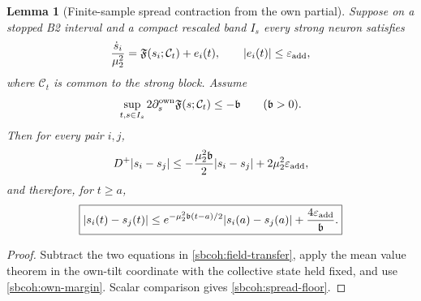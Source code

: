 \documentclass{article} %
\theoremstyle{plain}
\newtheorem{lemma}[theorem]{Lemma}
\theoremstyle{definition}
\theoremstyle{remark}
\begin{document}
\begin{lemma}[Finite-sample spread contraction from the own partial]
\label{sbcoh:spread}
Suppose on a stopped B2 interval and a compact rescaled band $I_s$ every
strong neuron satisfies
\begin{equation}\label{sbcoh:field-transfer}
 \frac{\dot s_i}{\mu_2^2}
 =\mathfrak F(s_i;\mathcal C_t)+e_i(t),
 \qquad
 |e_i(t)|\le\varepsilon_{\rm add},
\end{equation}
where $\mathcal C_t$ is common to the strong block.  Assume
\begin{equation}\label{sbcoh:own-margin}
 \sup_{t,s\in I_s}
 2\partial_s^{\rm own}\mathfrak F(s;\mathcal C_t)
 \le-\mathfrak b
 \qquad(\mathfrak b>0).
\end{equation}
Then for every pair $i,j$,
\begin{equation}\label{sbcoh:spread-dini}
 D^+|s_i-s_j|
 \le-\frac{\mu_2^2\mathfrak b}{2}|s_i-s_j|
      +2\mu_2^2\varepsilon_{\rm add},
\end{equation}
and therefore, for $t\ge a$,
\begin{equation}\label{sbcoh:spread-floor}
 \boxed{
 |s_i(t)-s_j(t)|
 \le e^{-\mu_2^2\mathfrak b(t-a)/2}|s_i(a)-s_j(a)|
 +\frac{4\varepsilon_{\rm add}}{\mathfrak b}.
 }
\end{equation}
\end{lemma}

\begin{proof}
Subtract the two equations in \eqref{sbcoh:field-transfer}, apply the mean
value theorem in the own-tilt coordinate with the collective state held fixed,
and use \eqref{sbcoh:own-margin}.  Scalar comparison gives
\eqref{sbcoh:spread-floor}.
\end{proof}
\end{document}
